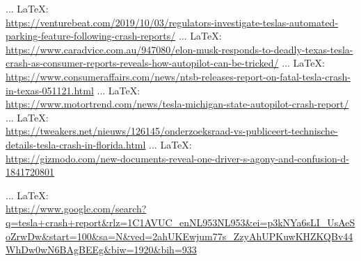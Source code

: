 \begin{thebibliography}{99}
{{{{{{{	 ... \LaTeX:\\ \url{https://venturebeat.com/2019/10/03/regulators-investigate-teslas-automated-parking-feature-following-crash-reports/}
	 ... \LaTeX:\\ \url{https://www.caradvice.com.au/947080/elon-musk-responds-to-deadly-texas-tesla-crash-as-consumer-reports-reveals-how-autopilot-can-be-tricked/}
	 ... \LaTeX:\\ \url{https://www.consumeraffairs.com/news/ntsb-releases-report-on-fatal-tesla-crash-in-texas-051121.html}
	 ... \LaTeX:\\ \url{https://www.motortrend.com/news/tesla-michigan-state-autopilot-crash-report/}
	 ... \LaTeX:\\ \url{https://tweakers.net/nieuws/126145/onderzoeksraad-vs-publiceert-technische-details-tesla-crash-in-florida.html}
	 ... \LaTeX:\\ \url{https://gizmodo.com/new-documents-reveal-one-driver-s-agony-and-confusion-d-1841720801}
	
	
	 ... \LaTeX:\\ \url{https://www.google.com/search?q=tesla+crash+report&rlz=1C1AVUC_enNL953NL953&ei=p3kNYa6sLI_UsAeSoZrwDw&start=100&sa=N&ved=2ahUKEwjum77s_ZzyAhUPKuwKHZKQBv44WhDw0wN6BAgBEEg&biw=1920&bih=933}
	
	
	
	
}}}}}}}
\end{thebibliography}
